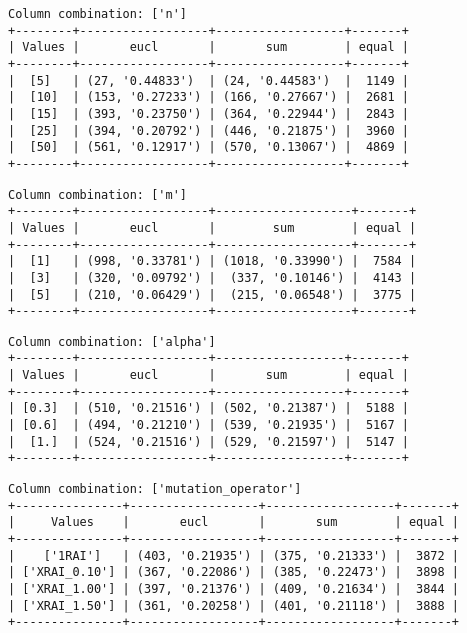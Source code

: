 \documentclass{article}
\begin{document}
\begin{verbatim}
Column combination: ['n']
+--------+------------------+------------------+-------+
| Values |       eucl       |       sum        | equal |
+--------+------------------+------------------+-------+
|  [5]   | (27, '0.44833')  | (24, '0.44583')  |  1149 |
|  [10]  | (153, '0.27233') | (166, '0.27667') |  2681 |
|  [15]  | (393, '0.23750') | (364, '0.22944') |  2843 |
|  [25]  | (394, '0.20792') | (446, '0.21875') |  3960 |
|  [50]  | (561, '0.12917') | (570, '0.13067') |  4869 |
+--------+------------------+------------------+-------+
\end{verbatim}

\begin{verbatim}
Column combination: ['m']
+--------+------------------+-------------------+-------+
| Values |       eucl       |        sum        | equal |
+--------+------------------+-------------------+-------+
|  [1]   | (998, '0.33781') | (1018, '0.33990') |  7584 |
|  [3]   | (320, '0.09792') |  (337, '0.10146') |  4143 |
|  [5]   | (210, '0.06429') |  (215, '0.06548') |  3775 |
+--------+------------------+-------------------+-------+
\end{verbatim}

\begin{verbatim}
Column combination: ['alpha']
+--------+------------------+------------------+-------+
| Values |       eucl       |       sum        | equal |
+--------+------------------+------------------+-------+
| [0.3]  | (510, '0.21516') | (502, '0.21387') |  5188 |
| [0.6]  | (494, '0.21210') | (539, '0.21935') |  5167 |
|  [1.]  | (524, '0.21516') | (529, '0.21597') |  5147 |
+--------+------------------+------------------+-------+
\end{verbatim}

\begin{verbatim}
Column combination: ['mutation_operator']
+---------------+------------------+------------------+-------+
|     Values    |       eucl       |       sum        | equal |
+---------------+------------------+------------------+-------+
|    ['1RAI']   | (403, '0.21935') | (375, '0.21333') |  3872 |
| ['XRAI_0.10'] | (367, '0.22086') | (385, '0.22473') |  3898 |
| ['XRAI_1.00'] | (397, '0.21376') | (409, '0.21634') |  3844 |
| ['XRAI_1.50'] | (361, '0.20258') | (401, '0.21118') |  3888 |
+---------------+------------------+------------------+-------+
\end{verbatim}
\end{document}
